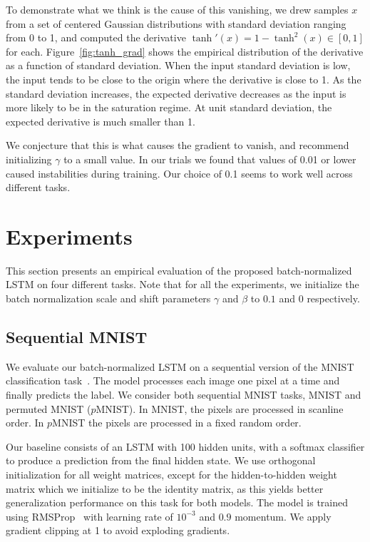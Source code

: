 \documentclass{article} %
\begin{document}
To demonstrate what we think is the cause of this vanishing, we drew samples
$x$ from a set of centered Gaussian distributions with standard deviation
ranging from 0 to 1, and computed the derivative $\tanh'(x) = 1 - \tanh^2(x)
\in [0, 1]$ for each.  Figure~\ref{fig:tanh_grad} shows the empirical
distribution of the derivative as a function of standard deviation.  When the
input standard deviation is low, the input tends to be close to the origin
where the derivative is close to 1.  As the standard deviation increases, the
expected derivative decreases as the input is more likely to be in the
saturation regime.  At unit standard deviation, the expected derivative is much
smaller than 1.

We conjecture that this is what causes the gradient to vanish, and recommend
initializing $\gamma$ to a small value.  In our trials we found that values of
0.01 or lower caused instabilities during training.  Our choice of 0.1 seems to
work well across different tasks.

\section{Experiments}
\label{sec:experiments}

This section presents an empirical evaluation of the proposed batch-normalized
LSTM on four different tasks.  Note that for all the experiments, we initialize
the batch normalization scale and shift parameters $\gamma$ and $\beta$ to
$0.1$ and $0$ respectively.

\subsection{Sequential MNIST}
\label{sec:seqmnist}

We evaluate our batch-normalized LSTM on a sequential version of the MNIST
classification task~\citep{le2015simple}.  The model processes each image one
pixel at a time and finally predicts the label.  We consider both sequential
MNIST tasks, MNIST and permuted MNIST ($p$MNIST).  In MNIST, the pixels are
processed in scanline order.  In $p$MNIST the pixels are processed in a fixed
random order.

Our baseline consists of an LSTM with 100 hidden units, with a softmax
classifier to produce a prediction from the final hidden state.  We use
orthogonal initialization for all weight matrices, except for the
hidden-to-hidden weight matrix which we initialize to be the identity matrix,
as this yields better generalization performance on this task for both models.
The model is trained using RMSProp~\citep{rmsprop} with learning rate of
$10^{-3}$ and $0.9$ momentum.  We apply gradient clipping at 1 to avoid
exploding gradients.
\end{document}
